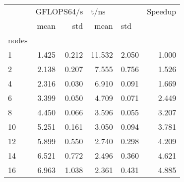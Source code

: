 \begin{tabular}{lrrrrr}
\toprule
{} & \multicolumn{2}{l}{GFLOPS64/s} & \multicolumn{2}{l}{t/ns} & Speedup \\
{} &       mean &    std &    mean & \multicolumn{2}{l}{std} \\
nodes &            &        &         &        &         \\
\midrule
1     &      1.425 &  0.212 &  11.532 &  2.050 &   1.000 \\
2     &      2.138 &  0.207 &   7.555 &  0.756 &   1.526 \\
4     &      2.316 &  0.030 &   6.910 &  0.091 &   1.669 \\
6     &      3.399 &  0.050 &   4.709 &  0.071 &   2.449 \\
8     &      4.450 &  0.066 &   3.596 &  0.055 &   3.207 \\
10    &      5.251 &  0.161 &   3.050 &  0.094 &   3.781 \\
12    &      5.899 &  0.550 &   2.740 &  0.298 &   4.209 \\
14    &      6.521 &  0.772 &   2.496 &  0.360 &   4.621 \\
16    &      6.963 &  1.038 &   2.361 &  0.431 &   4.885 \\
\bottomrule
\end{tabular}
